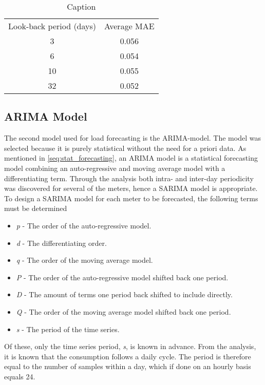 \begin{table}[]
    \centering
    \begin{tabular}{c|c}
         Look-back period (days)& Average MAE  \\
         3& 0.056\\
         6& 0.054\\
         10& 0.055\\
         32& 0.052
    \end{tabular}
    \caption[Average MAE persistence models]{Caption}
    \label{tab:avg_mae_chiwoza_med_persistence_2023}
\end{table}

\subsection{ARIMA Model}
The second model used for load forecasting is the ARIMA-model. The model was selected because it is purely statistical without the need for a priori data. As mentioned in \ref{seq:stat_forecasting}, an ARIMA model is a statistical forecasting model combining an auto-regressive and moving average model with a differentiating term. Through the analysis both intra- and inter-day periodicity was discovered for several of the meters, hence a SARIMA model is appropriate. To design a SARIMA model for each meter to be forecasted, the following terms must be determined
\begin{itemize}
    \item \textit{p}    -   The order of the auto-regressive model.
    \item \textit{d}    -   The differentiating order.
    \item \textit{q}    -   The order of the moving average model.
    \item \textit{P}    -   The order of the auto-regressive model shifted back one period.
    \item \textit{D}    -   The amount of terms one period back shifted to include directly.
    \item \textit{Q}    -   The order of the moving average model shifted back one period.
    \item \textit{s}    -   The period of the time series.
\end{itemize}

Of these, only the time series period, \textit{s}, is known in advance. From the analysis, it is known that the consumption follows a daily cycle. The period is therefore equal to the number of samples within a day, which if done on an hourly basis equals 24.\\

